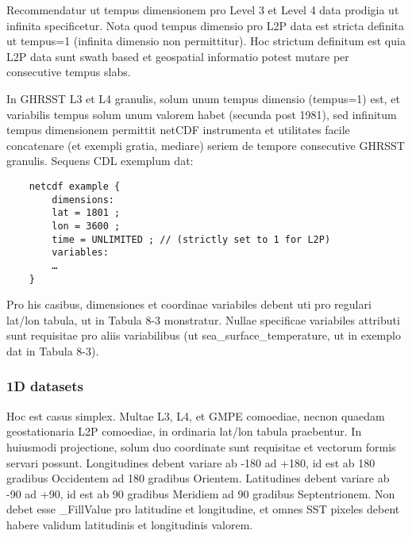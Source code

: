 Recommendatur ut tempus dimensionem pro Level 3 et Level 4 data prodigia ut infinita specificetur. Nota quod tempus dimensio pro L2P data est stricta definita ut tempus=1 (infinita dimensio non permittitur). Hoc strictum definitum est quia L2P data sunt swath based et geospatial informatio potest mutare per consecutive tempus slabs.
\par \vspace{0.1in}
In GHRSST L3 et L4 granulis, solum unum tempus dimensio (tempus=1) est, et variabilis tempus solum unum valorem habet (secunda post 1981), sed infinitum tempus dimensionem permittit netCDF instrumenta et utilitates facile concatenare (et exempli gratia, mediare) seriem de tempore consecutive GHRSST granulis. Sequens CDL exemplum dat:
\par \vspace{0.1in}

\begin{verbatim}
    netcdf example {
        dimensions:
        lat = 1801 ;
        lon = 3600 ;
        time = UNLIMITED ; // (strictly set to 1 for L2P)
        variables:
        …
    }
\end{verbatim}
\par \vspace{0.1in}
Pro his casibus, dimensiones et coordinae variabiles debent uti pro regulari lat/lon tabula, ut in Tabula 8-3 monstratur. Nullae specificae variabiles attributi sunt requisitae pro aliis variabilibus (ut sea\_surface\_temperature, ut in exemplo dat in Tabula 8-3).
\par \vspace{0.1in}


\subsubsection{1D datasets}
Hoc est casus simplex. Multae L3, L4, et GMPE comoediae, necnon quaedam geostationaria L2P comoediae, in ordinaria lat/lon tabula praebentur. In huiusmodi projectione, solum duo coordinate sunt requisitae et vectorum formis servari possunt. Longitudines debent variare ab -180 ad +180, id est ab 180 gradibus Occidentem ad 180 gradibus Orientem. Latitudines debent variare ab -90 ad +90, id est ab 90 gradibus Meridiem ad 90 gradibus Septentrionem. Non debet esse \_FillValue pro latitudine et longitudine, et omnes SST pixeles debent habere validum latitudinis et longitudinis valorem.
\par \vspace{0.1in}

